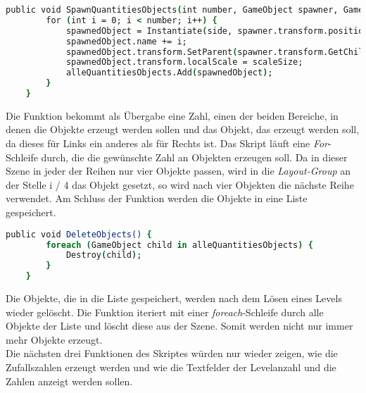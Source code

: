 \begin{lstlisting}[language=csh, caption={GameQuantities.cs SpawnQuantitiesObjects Funktion}]
	public void SpawnQuantitiesObjects(int number, GameObject spawner, GameObject side) {
		for (int i = 0; i < number; i++) {
			spawnedObject = Instantiate(side, spawner.transform.position, Quaternion.identity);
			spawnedObject.name += i;
			spawnedObject.transform.SetParent(spawner.transform.GetChild(i / 4));
			spawnedObject.transform.localScale = scaleSize;
			alleQuantitiesObjects.Add(spawnedObject);
		}
	}
\end{lstlisting}
Die Funktion bekommt als Übergabe eine Zahl, einen der beiden Bereiche, in denen die Objekte erzeugt werden sollen und das Objekt, das erzeugt werden soll, da dieses für Links ein anderes als für Rechts ist. Das Skript läuft eine \textit{For}-Schleife durch, die die gewünschte Zahl an Objekten erzeugen soll. Da in dieser Szene in jeder der Reihen nur vier Objekte passen, wird in die \textit{Layout-Group} an der Stelle i / 4 das Objekt gesetzt, so wird nach vier Objekten die nächste Reihe verwendet. Am Schluss der Funktion werden die Objekte in eine Liste gespeichert.\\
\begin{lstlisting}[language=csh, caption={GameQuantities.cs Delete Funktion}]
	public void DeleteObjects() {
		foreach (GameObject child in alleQuantitiesObjects) {
			Destroy(child);
		}
	}
\end{lstlisting}
Die Objekte, die in die Liste gespeichert, werden nach dem Lösen eines Levels wieder gelöscht. Die Funktion iteriert mit einer \textit{foreach}-Schleife durch alle Objekte der Liste und löscht diese aus der Szene. Somit werden nicht nur immer mehr Objekte erzeugt.\\

Die nächsten drei Funktionen des Skriptes würden nur wieder zeigen, wie die Zufallszahlen erzeugt werden und wie die Textfelder der Levelanzahl und die Zahlen anzeigt werden sollen.\\


